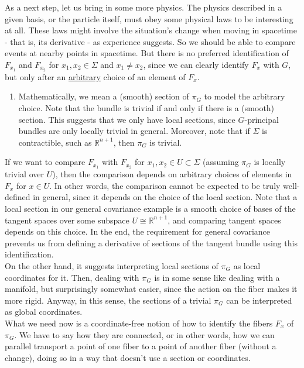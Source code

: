 \begin{enumerate}
As a next step, let us bring in some more physics.
The physics described in a given basis, or the particle itself, must obey some physical laws to be interesting at all.
These laws might involve the situation's change when moving in spacetime - that is, its derivative - as experience suggests.
So we should be able to compare events at nearby points in spacetime.
But there is no preferred identification of $F_{x_{1}}$ and $F_{x_{2}}$ for $x_{1},x_{2} \in \Sigma$ and $x_{1} \neq x_{2}$, since we can clearly identify $F_{x}$ with $G$, but only after an \underline{arbitrary} choice of an element of $F_{x}$.
\begin{enumerate}
\item[$\pmb{\hookrightarrow}$]
Mathematically, we mean a (smooth) section of $\pi_{G}$ to model the arbitrary choice.
Note that the bundle is trivial if and only if there is a (smooth) section.
This suggests that we only have local sections, since $G$-principal bundles are only locally trivial in general.
Moreover, note that if $\Sigma$ is contractible, such as $\mathbb{R}^{n+1}$, then $\pi_{G}$ is trivial.
\end{enumerate}
If we want to compare $F_{x_{1}}$ with $F_{x_{2}}$ for $x_{1},x_{2} \in U \subset \Sigma$ (assuming $\pi_{G}$ is locally trivial over $U$), then the comparison depends on arbitrary choices of elements in $F_{x}$ for $x \in U$.
In other words, the comparison cannot be expected to be truly well-defined in general, since it depends on the choice of the local section.
Note that a local section in our general covariance example is a smooth choice of bases of the tangent spaces over some subspace $U \cong \mathbb{R}^{n+1}$, and comparing tangent spaces depends on this choice.
In the end, the requirement for general covariance prevents us from defining a derivative of sections of the tangent bundle using this identification.
\\
On the other hand, it suggests interpreting local sections of $\pi_{G}$ as local coordinates for it.
Then, dealing with $\pi_{G}$ is in some sense like dealing with a manifold, but surprisingly somewhat easier, since the action on the fiber makes it more rigid.
Anyway, in this sense, the sections of a trivial $\pi_{G}$ can be interpreted as global coordinates.
\\
What we need now is a coordinate-free notion of how to identify the fibers $F_{x}$ of $\pi_{G}$.
We have to say how they are connected, or in other words, how we can parallel transport a point of one fiber to a point of another fiber (without a change), doing so in a way that doesn't use a section or coordinates.

\end{enumerate}
